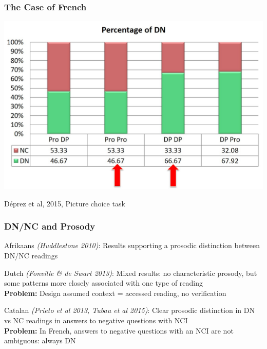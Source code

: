 \documentclass{beamer}
\begin{document}
\begin{frame}
\frametitle{The Case of French}
\begin{center}
\includegraphics[width=\linewidth]{figures/syntax_and_structure.jpg}
\end{center}
D\'eprez et al, 2015, Picture choice task
\end{frame}

\begin{frame}
\frametitle{DN/NC and Prosody}
\begin{block}{Afrikaans \textit{(Huddlestone 2010)}:}
Results supporting a prosodic distinction between DN/NC readings
\end{block}
\begin{block}{Dutch \textit{(Fonville \& de Swart 2013)}:}
Mixed results: no characteristic prosody, but some patterns more closely associated with one type of reading\\
\textbf{Problem:} Design assumed context = accessed reading, no verification
\end{block}
\begin{block}{Catalan \textit{(Prieto et al 2013, Tubau et al 2015)}:}
Clear prosodic distinction in DN vs NC readings in answers to negative questions with NCI\\
\textbf{Problem:} In French, answers to negative questions with an NCI are not ambiguous: always DN
\end{block}
\end{frame}
\end{document}
